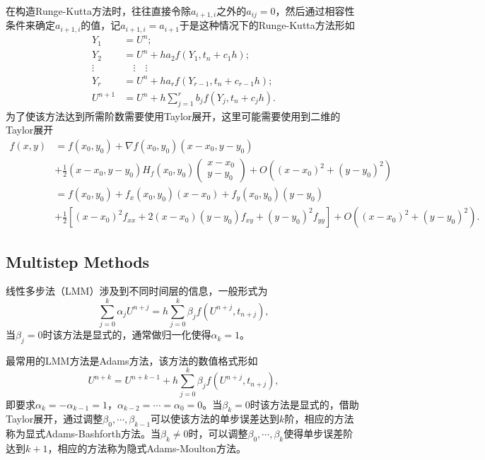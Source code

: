 \documentclass[a4paper,10pt]{ctexart}
\begin{document}
在构造Runge-Kutta方法时，往往直接令除$ a_{i+1,i} $之外的$ a_{ij}=0 $，然后通过相容性条件来确定$ a_{i+1,i} $的值，记$ a_{i+1,i} = a_{i+1} $于是这种情况下的Runge-Kutta方法形如
\begin{equation}
    \begin{aligned}
        Y_1 &= U^n;\\
        Y_2 &= U^n + h a_{2} f(Y_1,t_n+c_1h);\\
        \vdots&\quad \vdots\quad \vdots\\
        Y_r &= U^n + h a_{r} f(Y_{r-1},t_n+c_{r-1}h);\\
        U^{n+1} &= U^n + h\sum_{j=1}^r b_j f(Y_j,t_n+c_jh).
    \end{aligned}
\end{equation}
为了使该方法达到所需阶数需要使用Taylor展开，这里可能需要使用到二维的Taylor展开
\begin{equation}
    \begin{aligned}
        f(x,y) 
        &= f(x_0,y_0) + \nabla f(x_0,y_0)(x-x_0,y-y_0) \\
        &+ \frac{1}{2}(x-x_0,y-y_0)H_f(x_0,y_0)\begin{pmatrix}x-x_0\\y-y_0\end{pmatrix} + O((x-x_0)^2+(y-y_0)^2)\\
        &= f(x_0,y_0) + f_x(x_0,y_0)(x-x_0) + f_y(x_0,y_0)(y-y_0)\\
        &+ \frac{1}{2}\left[ (x-x_0)^2 f_{xx} +2(x-x_0)(y-y_0)f_{xy}+(y-y_0)^2f_{yy} \right] + O((x-x_0)^2+(y-y_0)^2).
    \end{aligned}
\end{equation}

\subsection{Multistep Methods}
线性多步法（LMM）涉及到不同时间层的信息，一般形式为
\begin{equation}
    \sum_{j=0}^k \alpha_j U^{n+j} = h\sum_{j=0}^k \beta_j f(U^{n+j},t_{n+j}),
\end{equation}
当$ \beta_j = 0 $时该方法是显式的，通常做归一化使得$ \alpha_k=1 $。

最常用的LMM方法是Adams方法，该方法的数值格式形如
\begin{equation}
    U^{n+k} = U^{n+k-1} + h\sum_{j=0}^k \beta_j f(U^{n+j},t_{n+j}),
\end{equation}
即要求$ \alpha_k=-\alpha_{k-1}=1 $，$ \alpha_{k-2}=\cdots =\alpha_0=0 $。当$ \beta_k=0 $时该方法是显式的，借助Taylor展开，通过调整$ \beta_0,\cdots ,\beta_{k-1} $可以使该方法的单步误差达到$ k $阶，相应的方法称为显式Adams-Bashforth方法。当$ \beta_k\ne 0 $时，可以调整$ \beta_0,\cdots ,\beta_{k} $使得单步误差阶达到$ k+1 $，相应的方法称为隐式Adams-Moulton方法。
\end{document}
